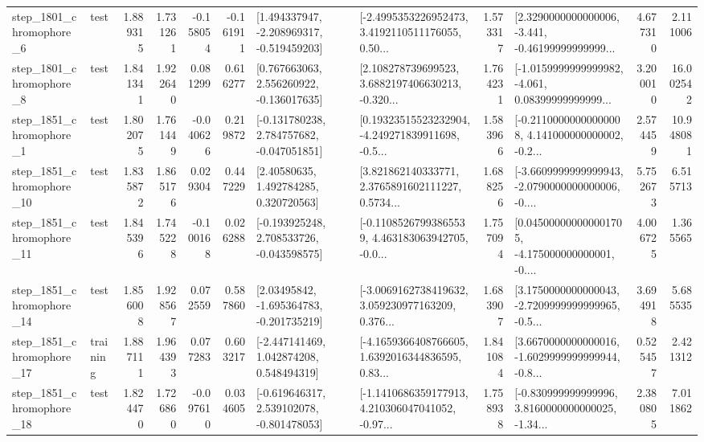\begin{tabular}{llrrrrllrlrr}
  step\_1801\_chromophore\_6 &      test &      1.889315 &    1.731261 &     -0.158054 & -0.161911 &   [1.494337947, -2.208969317, -0.519459203] &  [-2.4995353226952473, 3.4192110511176055, 0.50... &       1.573317 &  [2.3290000000000006, -3.441, -0.46199999999999... &            4.677310 &          2.111006 \\
  step\_1801\_chromophore\_8 &      test &      1.841341 &    1.922640 &      0.081299 &  0.616277 &    [0.767663063, 2.556260922, -0.136017635] &  [2.108278739699523, 3.6882197406630213, -0.320... &       1.764231 &  [-1.0159999999999982, -4.061, 0.08399999999999... &            3.200010 &         16.002542 \\
  step\_1851\_chromophore\_1 &      test &      1.802075 &    1.761449 &     -0.040626 &  0.219872 &   [-0.131780238, 2.784757682, -0.047051851] &  [0.19323515523232904, -4.249271839911698, -0.5... &       1.583966 &  [-0.21100000000000008, 4.141000000000002, -0.2... &            2.574459 &         10.948081 \\
 step\_1851\_chromophore\_10 &      test &      1.835872 &    1.865176 &      0.029304 &  0.447229 &      [2.40580635, 1.492784285, 0.320720563] &  [3.821862140333771, 2.3765891602111227, 0.5734... &       1.688256 &  [-3.6609999999999943, -2.0790000000000006, -0.... &            5.752673 &          6.515713 \\
 step\_1851\_chromophore\_11 &      test &      1.845396 &    1.745228 &     -0.100168 &  0.026288 &   [-0.193925248, 2.708533726, -0.043598575] &  [-0.11085267993865539, 4.463183063942705, -0.0... &       1.757094 &  [0.045000000000001705, -4.175000000000001, -0.... &            4.006725 &          1.365565 \\
 step\_1851\_chromophore\_14 &      test &      1.856008 &    1.928567 &      0.072559 &  0.587860 &    [2.03495842, -1.695364783, -0.201735219] &  [-3.0069162738419632, 3.059230977163209, 0.376... &       1.683907 &  [3.1750000000000043, -2.7209999999999965, -0.5... &            3.694918 &          5.685535 \\
 step\_1851\_chromophore\_17 &  training &      1.887111 &    1.964393 &      0.077283 &  0.603217 &    [-2.447141469, 1.042874208, 0.548494319] &  [-4.1659366408766605, 1.6392016344836595, 0.83... &       1.841084 &  [3.6670000000000016, -1.6029999999999944, -0.8... &            0.525457 &          2.421312 \\
 step\_1851\_chromophore\_18 &      test &      1.824470 &    1.726860 &     -0.097610 &  0.034605 &   [-0.619646317, 2.539102078, -0.801478053] &  [-1.1410686359177913, 4.210306047041052, -0.97... &       1.758938 &  [-0.830999999999996, 3.8160000000000025, -1.34... &            2.380805 &          7.011862 \\

\end{tabular}
